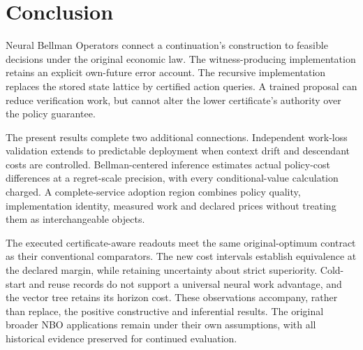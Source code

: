 \documentclass[ecta,nameyear,draft]{econsocart}
\begin{document}












\section{Conclusion}\label{sec:conclusion65}
Neural Bellman Operators connect a continuation's construction to feasible decisions under the original economic law. The witness-producing implementation retains an explicit own-future error account. The recursive implementation replaces the stored state lattice by certified action queries. A trained proposal can reduce verification work, but cannot alter the lower certificate's authority over the policy guarantee.

The present results complete two additional connections. Independent work-loss validation extends to predictable deployment when context drift and descendant costs are controlled. Bellman-centered inference estimates actual policy-cost differences at a regret-scale precision, with every conditional-value calculation charged. A complete-service adoption region combines policy quality, implementation identity, measured work and declared prices without treating them as interchangeable objects.

The executed certificate-aware readouts meet the same original-optimum contract as their conventional comparators. The new cost intervals establish equivalence at the declared margin, while retaining uncertainty about strict superiority. Cold-start and reuse records do not support a universal neural work advantage, and the vector tree retains its horizon cost. These observations accompany, rather than replace, the positive constructive and inferential results. The original broader NBO applications remain under their own assumptions, with all historical evidence preserved for continued evaluation.



\end{document}
